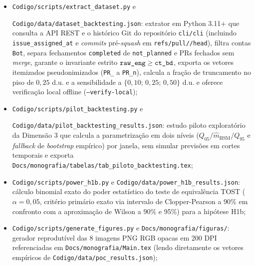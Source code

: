 \documentclass[12pt,openany,oneside,a4paper,english,brazilian,sumario=tradicional]{abntex2}
\begin{document}
\begin{apendicesenv}
\begin{itemize}
\begin{itemize}
    \item \texttt{Codigo/\allowbreak scripts/\allowbreak }\allowbreak\texttt{extract\_\allowbreak dataset.py} e\par\noindent \texttt{Codigo/\allowbreak }\allowbreak\texttt{data/\allowbreak }\allowbreak\texttt{dataset\_\allowbreak backtesting.json}: extrator em Python 3.11+ que consulta a API REST e o histórico Git do repositório \texttt{cli/\allowbreak cli} (incluindo \texttt{issue\_\allowbreak assigned\_\allowbreak at} e \textit{commits} pré-\textit{squash} em \texttt{refs/\allowbreak pull/\allowbreak */\allowbreak head}), filtra contas \texttt{Bot}, separa fechamentos \texttt{completed} de \texttt{not\_\allowbreak planned} e PRs fechados sem \textit{merge}, garante o invariante estrito $\texttt{raw\_\allowbreak eng} \ge \texttt{ct\_\allowbreak bd}$, exporta os vetores itemizados pseudonimizados (\texttt{PR\_} a \texttt{PR\_\allowbreak n}), calcula a fração de truncamento no piso de $0{,}25$ d.u. e a sensibilidade a $\{0{,}10;\,0{,}25;\,0{,}50\}$ d.u. e oferece verificação local offline (\texttt{--verify-local});
    \item \texttt{Codigo/\allowbreak scripts/\allowbreak }\allowbreak\texttt{pilot\_\allowbreak backtesting.py} e\par\noindent \texttt{Codigo/\allowbreak }\allowbreak\texttt{data/\allowbreak }\allowbreak\texttt{pilot\_\allowbreak backtesting\_\allowbreak results.json}: estudo piloto exploratório da Dimensão 3 que calcula a parametrização em dois níveis ($Q_{05}/\hat{m}_{\mathrm{HSM}}/Q_{95}$ e \textit{fallback} de \textit{bootstrap} empírico) por janela, sem simular previsões em cortes temporais e exporta \texttt{Docs/\allowbreak }\allowbreak\texttt{monografia/\allowbreak }\allowbreak\texttt{tabelas/\allowbreak }\allowbreak\texttt{tab\_\allowbreak piloto\_\allowbreak backtesting.tex};
    \item \texttt{Codigo/\allowbreak scripts/\allowbreak }\allowbreak\texttt{power\_\allowbreak h1b.py} e \texttt{Codigo/\allowbreak }\allowbreak\texttt{data/\allowbreak }\allowbreak\texttt{power\_\allowbreak h1b\_\allowbreak results.json}: cálculo binomial exato do poder estatístico do teste de equivalência TOST ($\alpha=0{,}05$, critério primário exato via intervalo de Clopper-Pearson a 90\% em confronto com a aproximação de Wilson a 90\% e 95\%) para a hipótese H1b;
    \item \texttt{Codigo/\allowbreak scripts/\allowbreak }\allowbreak\texttt{generate\_\allowbreak figures.py} e \texttt{Docs/\allowbreak }\allowbreak\texttt{monografia/\allowbreak }\allowbreak\texttt{figuras/\allowbreak }: gerador reprodutível das 8 imagens PNG RGB opacas em 200 DPI referenciadas em \texttt{Docs/\allowbreak monografia/\allowbreak Main.tex} (lendo diretamente os vetores empíricos de \texttt{Codigo/\allowbreak }\allowbreak\texttt{data/\allowbreak }\allowbreak\texttt{poc\_\allowbreak results.json});

\end{itemize}
\end{itemize}
\end{apendicesenv}
\end{document}
